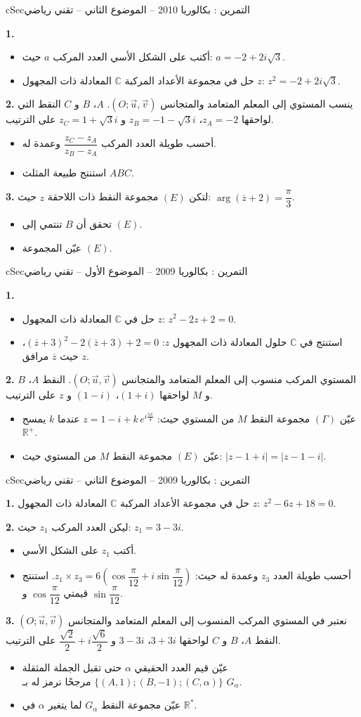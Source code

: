 \documentclass[12pt,a4paper]{article}
\newenvironment{BOX}[2]{\begin{otherlanguage}{english}\begin{arbox}{#1}{#2}}{\end{arbox}\end{otherlanguage}}
\newcounter{exo}
\newenvironment{tamrin}[1]{\stepcounter{exo}\begin{BOX}{cSec}{التمرين \theexo: #1}}{\end{BOX}}
\newcommand{\R}{\mathbb{R}}
\newenvironment{sq}{\begin{itemize}[leftmargin=2.4em,itemsep=3pt]}{\end{itemize}}
\newcommand{\qa}{\item[(أ)]}\newcommand{\qb}{\item[(ب)]}\newcommand{\qc}{\item[(جـ)]}\newcommand{\qd}{\item[(د)]}\newcommand{\qe}{\item[(هـ)]}
\newcommand{\QQ}[1]{\par\smallskip\textbf{#1.} }
\begin{document}
\begin{tamrin}{بكالوريا 2010 -- الموضوع الثاني -- تقني رياضي}
\QQ{1}
\begin{sq}
\qa أكتب على الشكل الأسي العدد المركب $a$ حيث: $a=-2+2i\sqrt3$.
\qb حل في مجموعة الأعداد المركبة $\mathbb{C}$ المعادلة ذات المجهول $z$: $z^2=-2+2i\sqrt3$.
\end{sq}
\QQ{2} ينسب المستوي إلى المعلم المتعامد والمتجانس $(O;\vec u,\vec v)$.
$A$، $B$ و $C$ النقط التي لواحقها $z_A=-2$، $z_B=-1-\sqrt3 i$ و $z_C=1+\sqrt3 i$ على الترتيب.
\begin{sq}
\qa أحسب طويلة العدد المركب $\dfrac{z_C-z_A}{z_B-z_A}$ وعمدة له.
\qb استنتج طبيعة المثلث $ABC$.
\end{sq}
\QQ{3} لتكن $(E)$ مجموعة النقط ذات اللاحقة $z$ حيث: $\arg(\overline{z}+2)=\dfrac{\pi}{3}$.
\begin{sq}
\qa تحقق أن $B$ تنتمي إلى $(E)$.
\qb عيّن المجموعة $(E)$.
\end{sq}
\end{tamrin}

\begin{tamrin}{بكالوريا 2009 -- الموضوع الأول -- تقني رياضي}
\QQ{1}
\begin{sq}
\qa حل في $\mathbb{C}$ المعادلة ذات المجهول $z$: $z^2-2z+2=0$.
\qb استنتج في $\mathbb{C}$ حلول المعادلة ذات المجهول $z$: $(\overline{z}+3)^2-2(\overline{z}+3)+2=0$، حيث $\overline{z}$ مرافق $z$.
\end{sq}
\QQ{2} المستوي المركب منسوب إلى المعلم المتعامد والمتجانس $(O;\vec u,\vec v)$.
النقط $A$، $B$ و $M$ لواحقها $(1+i)$، $(1-i)$ و $z$ على الترتيب.
\begin{sq}
\qa عيّن $(\Gamma)$ مجموعة النقط $M$ من المستوي حيث: $z=1-i+k\,e^{i\frac{5\pi}{4}}$ عندما $k$ يمسح $\R^+$.
\qb عيّن $(E)$ مجموعة النقط $M$ من المستوي حيث: $|z-1+i|=|z-1-i|$.
\end{sq}
\end{tamrin}

\begin{tamrin}{بكالوريا 2009 -- الموضوع الثاني -- تقني رياضي}
\QQ{1} حل في مجموعة الأعداد المركبة $\mathbb{C}$ المعادلة ذات المجهول $z$: $z^2-6z+18=0$.
\QQ{2} ليكن العدد المركب $z_1$ حيث: $z_1=3-3i$.
\begin{sq}
\qa أكتب $z_1$ على الشكل الأسي.
\qb أحسب طويلة العدد $z_3$ وعمدة له حيث: $z_1\times z_3=6\left(\cos\dfrac{\pi}{12}+i\sin\dfrac{\pi}{12}\right)$. استنتج قيمتي $\cos\dfrac{\pi}{12}$ و $\sin\dfrac{\pi}{12}$.
\end{sq}
\QQ{3} نعتبر في المستوي المركب المنسوب إلى المعلم المتعامد والمتجانس $(O;\vec u,\vec v)$ النقط $A$، $B$ و $C$ لواحقها $3+3i$، $3-3i$ و $\dfrac{\sqrt2}{2}+i\dfrac{\sqrt6}{2}$ على الترتيب.
\begin{sq}
\qa عيّن قيم العدد الحقيقي $\alpha$ حتى تقبل الجملة المثقلة $\{(A,1);(B,-1);(C,\alpha)\}$ مرجحًا نرمز له بـ $G_\alpha$.
\qb عيّن مجموعة النقط $G_\alpha$ لما يتغير $\alpha$ في $\R^*$.
\end{sq}
\end{tamrin}
\end{document}
